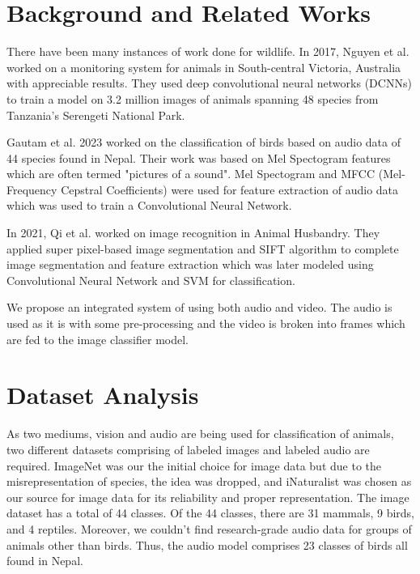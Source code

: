 \documentclass[fleqn, 10pt, twoside]{IOEGC}
\begin{document}
\section{Background and Related Works}
There have been many instances of work done for wildlife. In 2017, Nguyen et al.\cite{r4} worked on a monitoring system for animals in South-central Victoria, Australia with appreciable results. They used deep convolutional neural networks (DCNNs) to train a model on 3.2 million images of animals spanning 48 species from Tanzania's Serengeti National Park.
\par
Gautam et al. 2023 \cite{r5} worked on the classification of birds based on audio data of 44 species found in Nepal. Their work was based on Mel Spectogram features which are often termed "pictures of a sound". Mel Spectogram and MFCC (Mel-Frequency Cepstral Coefficients) were used for feature extraction of audio data which was used to train a Convolutional Neural Network.
\par
In 2021, Qi et al. \cite{r6} worked on image recognition in Animal Husbandry. They applied super pixel-based image segmentation and SIFT algorithm to complete image segmentation and feature extraction which was later modeled using Convolutional Neural Network and SVM for classification.
\par
We propose an integrated system of using both audio and video. The audio is used as it is with some pre-processing and the video is broken into frames which are fed to the image classifier model.

\section{Dataset Analysis}
As two mediums, vision and audio are being used for
classification of animals, two different datasets comprising of
labeled images and labeled audio are required. ImageNet was our
the initial choice for image data but due to the misrepresentation of
species, the idea was dropped, and iNaturalist was chosen as our
source for image data for its reliability and proper
representation\cite{r9}.
The image dataset has a total of 44 classes. Of the 44 classes, there are 31 mammals, 9 birds, and 4 reptiles. Moreover, we couldn’t find research-grade audio data for groups of animals other than birds. Thus, the audio model comprises 23 classes of birds all found in Nepal.
\end{document}
